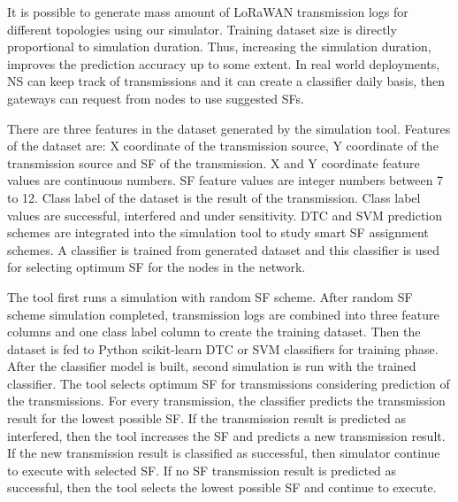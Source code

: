 \documentclass[conference]{IEEEtran}
\begin{document}
It is possible to generate mass amount of LoRaWAN transmission logs for different topologies using our simulator. Training dataset size is directly proportional to simulation duration. Thus, increasing the simulation duration, improves the prediction accuracy up to some extent. In real world deployments, NS can keep track of transmissions and it can create a classifier daily basis, then gateways can request from nodes to use suggested SFs.

There are three features in the dataset generated by the simulation tool. Features of the dataset are: X coordinate of the transmission source, Y coordinate of the transmission source and SF of the transmission. X and Y coordinate feature values are continuous numbers. SF feature values are integer numbers between 7 to 12. Class label of the dataset is the result of the transmission. Class label values are successful, interfered and under sensitivity. DTC and SVM prediction schemes are integrated into the simulation tool to study smart SF assignment schemes. A classifier is trained from generated dataset and this classifier is used for selecting optimum SF for the nodes in the network.

The tool first runs a simulation with random SF scheme. After random SF scheme simulation completed, transmission logs are combined into three feature columns and one class label column to create the training dataset. Then the dataset is fed to Python scikit-learn DTC or SVM classifiers for training phase. After the classifier model is built, second simulation is run with the trained classifier. The tool selects optimum SF for transmissions considering prediction of the transmissions. For every transmission, the classifier predicts the transmission result for the lowest possible SF. If the transmission result is predicted as interfered, then the tool increases the SF and predicts a new transmission result. If the new transmission result is classified as successful, then simulator continue to execute with selected SF. If no SF transmission result is predicted as successful, then the tool selects the lowest possible SF and continue to execute.
\end{document}
